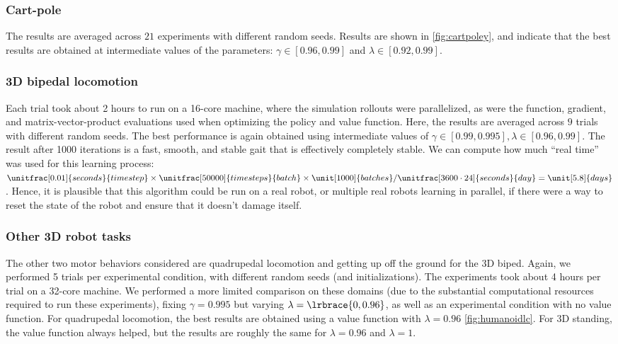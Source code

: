 \subsubsection{Cart-pole}

The results are averaged across $21$ experiments with different random seeds. Results are shown in \ref{fig:cartpoley}, and indicate that the best results are obtained at intermediate values of the parameters: $\gamma \in [0.96, 0.99]$ and $\lambda \in [0.92, 0.99]$.

\subsubsection{3D bipedal locomotion}

Each trial took about 2 hours to run on a 16-core machine, where the simulation rollouts were parallelized, as were the function, gradient, and matrix-vector-product evaluations used when optimizing the policy and value function. Here, the results are averaged across $9$ trials with different random seeds. The best performance is again obtained using intermediate values of $\gamma \in [0.99, 0.995], \lambda \in [0.96, 0.99]$. The result after 1000 iterations is a fast, smooth, and stable gait that is effectively completely stable. We can compute how much ``real time'' was used for this learning process: $\unitfrac[0.01]{seconds}{timestep} \times \unitfrac[50000]{timesteps}{batch} \times \unit[1000]{batches} / \unitfrac[3600 \cdot 24]{seconds}{day}=\unit[5.8]{days}$.
Hence, it is plausible that this algorithm could be run on a real robot, or multiple real robots learning in parallel, if there were a way to reset the state of the robot and ensure that it doesn't damage itself.

\subsubsection{Other 3D robot tasks} The other two motor behaviors considered are quadrupedal locomotion and getting up off the ground for the 3D biped. Again, we performed 5 trials per experimental condition, with different random seeds (and initializations). The experiments took about 4 hours per trial on a 32-core machine. We performed a more limited comparison on these domains (due to the substantial computational resources required to run these experiments), fixing $\gamma=0.995$ but varying $\lambda = \lrbrace{0,0.96}$, as well as an experimental condition with no value function. For quadrupedal locomotion, the best results are obtained using a value function with $\lambda=0.96$ \ref{fig:humanoidlc}.
For 3D standing, the value function always helped, but the results are roughly the same for $\lambda=0.96$ and $\lambda=1$.

